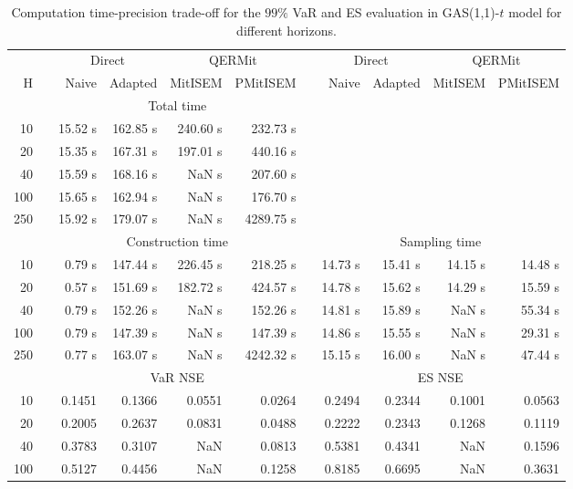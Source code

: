 { \renewcommand{\arraystretch}{1.3} 
\begin{table}[h] 
\centering 
\caption{Computation time-precision trade-off for the  $99\%$ VaR and ES evaluation in GAS(1,1)-$t$ model for different horizons.} 
\label{tab:time_precision_t_gas} 
\begin{tabular}{rr rrrr r rrrr}  
 & & \multicolumn{2}{c}{Direct} & \multicolumn{2}{c}{QERMit}&  & \multicolumn{2}{c}{Direct} & \multicolumn{2}{c}{QERMit} \\ \cline{3-6} \cline{8-11} 
 H & & Naive & Adapted & MitISEM & PMitISEM & & Naive & Adapted & MitISEM & PMitISEM \\ \hline 
 & & \multicolumn{4}{c}{Total time}  \\ \cline{3-6} 
10 & & 15.52 s & 162.85 s & 240.60 s & 232.73 s \\ 
20 & & 15.35 s & 167.31 s & 197.01 s & 440.16 s \\ 
40 & & 15.59 s & 168.16 s &  NaN s & 207.60 s \\ 
100 & & 15.65 s & 162.94 s &  NaN s & 176.70 s \\ 
250 & & 15.92 s & 179.07 s &  NaN s & 4289.75 s \\ 
\hline 
 & & \multicolumn{4}{c}{Construction time} & & \multicolumn{4}{c}{ Sampling time} \\ \cline{3-6}  \cline{8-11}
10 & & 0.79 s & 147.44 s & 226.45 s & 218.25 s && 14.73 s & 15.41 s & 14.15 s & 14.48 s \\ 
20 & & 0.57 s & 151.69 s & 182.72 s & 424.57 s && 14.78 s & 15.62 s & 14.29 s & 15.59 s \\ 
40 & & 0.79 s & 152.26 s &  NaN s & 152.26 s && 14.81 s & 15.89 s &  NaN s & 55.34 s \\ 
100 & & 0.79 s & 147.39 s &  NaN s & 147.39 s && 14.86 s & 15.55 s &  NaN s & 29.31 s \\ 
250 & & 0.77 s & 163.07 s &  NaN s & 4242.32 s && 15.15 s & 16.00 s &  NaN s & 47.44 s \\ 
\hline 
 & & \multicolumn{4}{c}{VaR NSE} &&  \multicolumn{4}{c}{ES NSE} \\ \cline{3-6}  \cline{8-11}
10 && 0.1451  & 0.1366  & 0.0551 & 0.0264 && 0.2494  & 0.2344  & 0.1001 & 0.0563 \\ 
20 && 0.2005  & 0.2637  & 0.0831 & 0.0488 && 0.2222  & 0.2343  & 0.1268 & 0.1119 \\ 
40 && 0.3783  & 0.3107  &    NaN & 0.0813 && 0.5381  & 0.4341  &    NaN & 0.1596 \\ 
100 && 0.5127  & 0.4456  &    NaN & 0.1258 && 0.8185  & 0.6695  &    NaN & 0.3631 \\ 

\end{tabular}
\end{table}}
